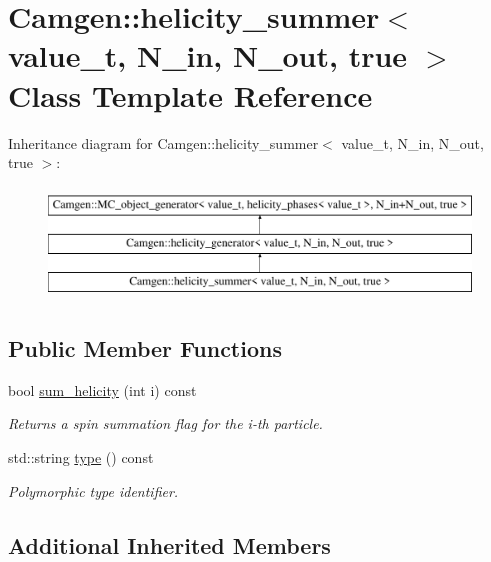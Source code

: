 \hypertarget{a00277}{\section{Camgen\-:\-:helicity\-\_\-summer$<$ value\-\_\-t, N\-\_\-in, N\-\_\-out, true $>$ Class Template Reference}
\label{a00277}
}
Inheritance diagram for Camgen\-:\-:helicity\-\_\-summer$<$ value\-\_\-t, N\-\_\-in, N\-\_\-out, true $>$\-:\begin{figure}[H]
\begin{center}
\leavevmode
\includegraphics[height=3.000000cm]{a00277}
\end{center}
\end{figure}
\subsection*{Public Member Functions}
\begin{DoxyCompactItemize}
\item 
bool \hyperlink{a00277_a4575189a6a7b4c223b76753639dec319}{sum\-\_\-helicity} (int i) const 
\begin{DoxyCompactList}\small\item\em Returns a spin summation flag for the i-\/th particle. \end{DoxyCompactList}\item 
\hypertarget{a00277_a96241b3c89d99880657283ccab987147}{std\-::string \hyperlink{a00277_a96241b3c89d99880657283ccab987147}{type} () const }\label{a00277_a96241b3c89d99880657283ccab987147}

\begin{DoxyCompactList}\small\item\em Polymorphic type identifier. \end{DoxyCompactList}\end{DoxyCompactItemize}
\subsection*{Additional Inherited Members}



